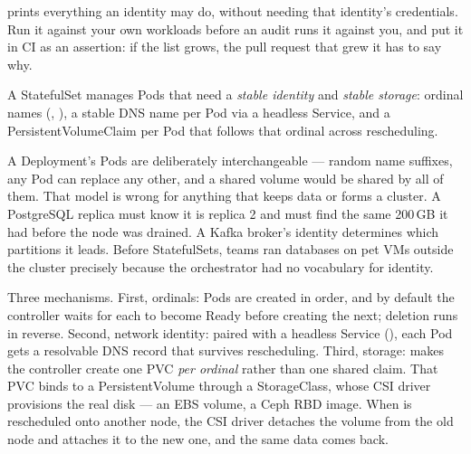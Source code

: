 \begin{prodtip}
 prints everything an identity may do, without needing that identity's credentials. Run it against your own workloads before an audit runs it against you, and put it in CI as an assertion: if the list grows, the pull request that grew it has to say why.
\end{prodtip}


 A StatefulSet manages Pods that need a \emph{stable identity} and \emph{stable storage}: ordinal names (, ), a stable DNS name per Pod via a headless Service, and a PersistentVolumeClaim per Pod that follows that ordinal across rescheduling.

 A Deployment's Pods are deliberately interchangeable --- random name suffixes, any Pod can replace any other, and a shared volume would be shared by all of them. That model is wrong for anything that keeps data or forms a cluster. A PostgreSQL replica must know it is replica 2 and must find the same 200\,GB it had before the node was drained. A Kafka broker's identity determines which partitions it leads. Before StatefulSets, teams ran databases on pet VMs outside the cluster precisely because the orchestrator had no vocabulary for identity.

 Three mechanisms. First, ordinals: Pods are created  in order, and by default the controller waits for each to become Ready before creating the next; deletion runs in reverse. Second, network identity: paired with a headless Service (), each Pod gets a resolvable DNS record  that survives rescheduling. Third, storage:  makes the controller create one PVC \emph{per ordinal} rather than one shared claim. That PVC binds to a PersistentVolume through a StorageClass, whose CSI driver provisions the real disk --- an EBS volume, a Ceph RBD image. When  is rescheduled onto another node, the CSI driver detaches the volume from the old node and attaches it to the new one, and the same data comes back.

